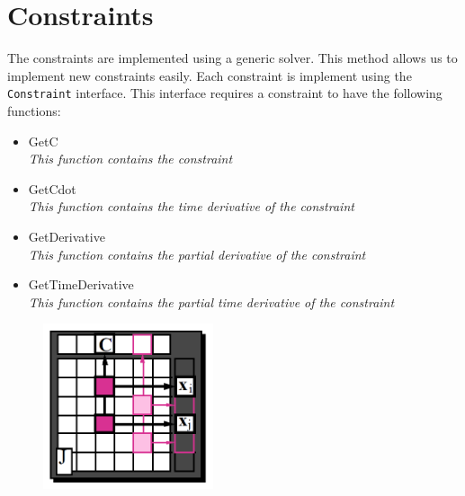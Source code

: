 \section{Constraints}

The constraints are implemented using a generic solver.
This method allows us to implement new constraints easily.
Each constraint is implement using the \verb"Constraint" interface.
This interface requires a constraint to have the following functions:
\begin{itemize}
  \item GetC\\
  \emph{ This function contains the constraint }
  \item GetCdot\\
  \emph{ This function contains the time derivative of the constraint }
  \item GetDerivative\\
  \emph{ This function contains the partial derivative of the constraint  }
  \item GetTimeDerivative\\
  \emph{ This function contains the partial time derivative of the constraint }
\end{itemize}

\begin{figure}[t]
  \centering
  \includegraphics[width=5cm]{img/jacobian.png}
  \label{fig:jacobian}
\end{figure}

